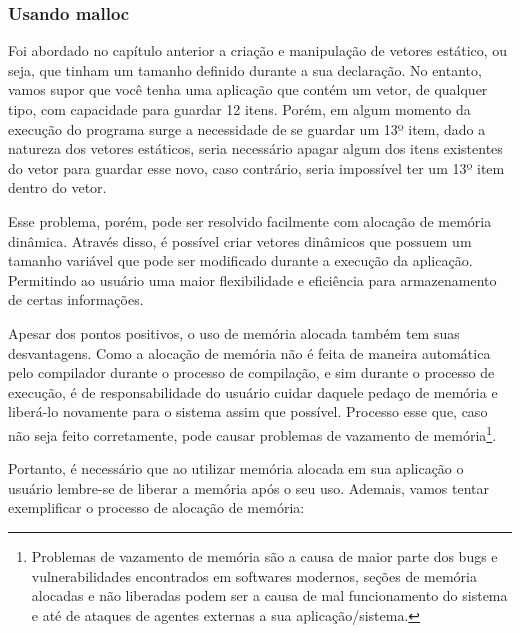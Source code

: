 \subsubsection{Usando malloc}

Foi abordado no capítulo anterior a criação e manipulação de vetores estático, 
ou seja, que tinham um tamanho definido durante a sua declaração. No entanto, 
vamos supor que você tenha uma aplicação que contém um vetor, de qualquer tipo, 
com capacidade para guardar 12 itens. Porém, em algum momento da execução do 
programa surge a necessidade de se guardar um 13º item, dado a natureza dos 
vetores estáticos, seria necessário apagar algum dos itens existentes do vetor 
para guardar esse novo, caso contrário, seria impossível ter um 13º item dentro 
do vetor.

Esse problema, porém, pode ser resolvido facilmente com alocação de memória 
dinâmica. Através disso, é possível criar vetores dinâmicos que possuem um 
tamanho variável que pode ser modificado durante a execução da aplicação. 
Permitindo ao usuário uma maior flexibilidade e eficiência para armazenamento 
de certas informações.

Apesar dos pontos positivos, o uso de memória alocada também tem suas 
desvantagens. Como a alocação de memória não é feita de maneira automática pelo 
compilador durante o processo de compilação, e sim durante o processo de 
execução, é de responsabilidade do usuário cuidar daquele pedaço de memória e 
liberá-lo novamente para o sistema assim que possível. Processo esse que, caso 
não seja feito corretamente, pode causar problemas de vazamento de 
memória\footnote{Problemas de vazamento de memória são a causa de maior parte 
dos bugs e vulnerabilidades encontrados em softwares modernos, seções de 
memória alocadas e não liberadas podem ser a causa de mal funcionamento do 
sistema e até de ataques de agentes externas a sua aplicação/sistema.}.

Portanto, é necessário que ao utilizar memória alocada em sua aplicação o 
usuário lembre-se de liberar a memória após o seu uso. Ademais, vamos tentar 
exemplificar o processo de alocação de memória:

